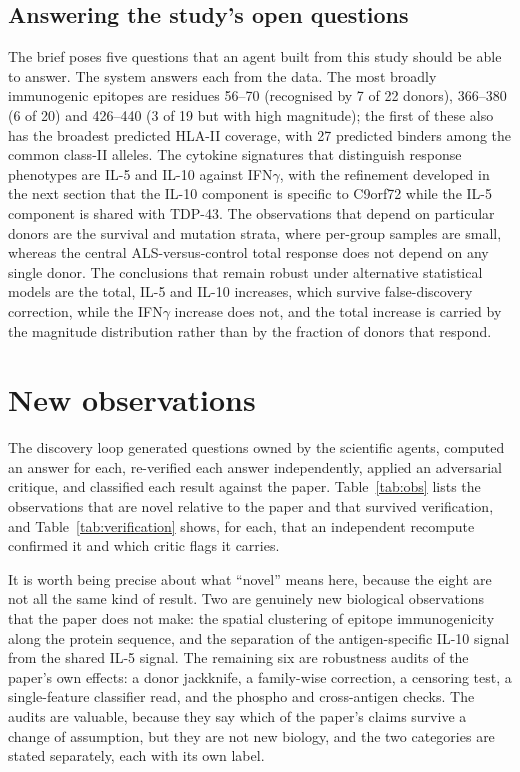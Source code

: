 \documentclass[11pt]{article}
\begin{document}
\subsection{Answering the study's open questions}
The brief poses five questions that an agent built from this study should be able to answer. The
system answers each from the data. The most broadly immunogenic epitopes are residues 56--70
(recognised by 7 of 22 donors), 366--380 (6 of 20) and 426--440 (3 of 19 but with high magnitude);
the first of these also has the broadest predicted HLA-II coverage, with 27 predicted binders among
the common class-II alleles. The cytokine signatures that distinguish response phenotypes are IL-5
and IL-10 against IFN$\gamma$, with the refinement developed in the next section that the IL-10
component is specific to C9orf72 while the IL-5 component is shared with TDP-43. The observations
that depend on particular donors are the survival and mutation strata, where per-group samples are
small, whereas the central ALS-versus-control total response does not depend on any single donor.
The conclusions that remain robust under alternative statistical models are the total, IL-5 and
IL-10 increases, which survive false-discovery correction, while the IFN$\gamma$ increase does not,
and the total increase is carried by the magnitude distribution rather than by the fraction of
donors that respond.

\section{New observations}
The discovery loop generated \NumQuestions{} questions owned by the scientific agents, computed an
answer for each, re-verified each answer independently, applied an adversarial critique, and
classified each result against the paper. Table~\ref{tab:obs} lists the \NumObservations{}
observations that are novel relative to the paper and that survived verification, and
Table~\ref{tab:verification} shows, for each, that an independent recompute confirmed it and which
critic flags it carries.

It is worth being precise about what ``novel'' means here, because the eight are not all the same
kind of result. Two are genuinely new biological observations that the paper does not make: the
spatial clustering of epitope immunogenicity along the protein sequence, and the separation of the
antigen-specific IL-10 signal from the shared IL-5 signal. The remaining six are robustness audits of
the paper's own effects: a donor jackknife, a family-wise correction, a censoring test, a
single-feature classifier read, and the phospho and cross-antigen checks. The audits are valuable,
because they say which of the paper's claims survive a change of assumption, but they are not new
biology, and the two categories are stated separately, each with its own label.
\end{document}
